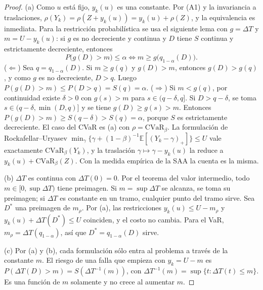 \begin{proof}
(a) Como $u$ está fijo, $y_k(u)$ es una constante. Por (A1) y la invariancia a traslaciones,
$\rho(Y_k)=\rho(Z+y_k(u))=y_k(u)+\rho(Z)$, y la equivalencia es inmediata. Para la restricción
probabilística se usa el siguiente lema con $g=\Delta T$ y $m=U-y_k(u)$: si $g$ es no decreciente
y continua y $D$ tiene $S$ continua y estrictamente decreciente, entonces
\[P\big(g(D)>m\big)\le\alpha\iff m\ge g\big(q_{1-\alpha}(D)\big).\]
($\Leftarrow$) Sea $q=q_{1-\alpha}(D)$. Si $m\ge g(q)$ y $g(D)>m$, entonces $g(D)>g(q)$, y como $g$
es no decreciente, $D>q$. Luego $P(g(D)>m)\le P(D>q)=S(q)=\alpha$. ($\Rightarrow$) Si $m<g(q)$, por
continuidad existe $\delta>0$ con $g(s)>m$ para $s\in(q-\delta,q]$. Si $D>q-\delta$, se toma
$s\in(q-\delta,\min(D,q)]$ y se tiene $g(D)\ge g(s)>m$. Entonces
$P(g(D)>m)\ge S(q-\delta)>S(q)=\alpha$, porque $S$ es estrictamente decreciente.
El caso del CVaR es (a) con $\rho=\mathrm{CVaR}_\beta$. La formulación de Rockafellar--Uryasev
$\min_\gamma\{\gamma+(1-\beta)^{-1}\mathbb E[(Y_k-\gamma)_+]\}\le U$ vale exactamente
$\mathrm{CVaR}_\beta(Y_k)$, y la traslación $\gamma\mapsto\gamma-y_k(u)$ la reduce a
$y_k(u)+\mathrm{CVaR}_\beta(Z)$. Con la medida empírica de la SAA la cuenta es la misma.

(b) $\Delta T$ es continua con $\Delta T(0)=0$. Por el teorema del valor intermedio, todo
$m\in[0,\sup\Delta T)$ tiene preimagen. Si $m=\sup\Delta T$ se alcanza, se toma su preimagen;
si $\Delta T$ es constante en un tramo, cualquier punto del tramo sirve. Sea $D^\ast$ una
preimagen de $m_\rho$. Por (a), las restricciones $y_k(u)\le U-m_\rho$ y
$y_k(u)+\Delta T(D^\ast)\le U$ coinciden, y el costo no cambia. Para el VaR,
$m_\rho=\Delta T(q_{1-\alpha})$, así que $D^\ast=q_{1-\alpha}(D)$ sirve.

(c) Por (a) y (b), cada formulación sólo entra al problema a través de la constante $m$. El
riesgo de una falla que empieza con $y_k=U-m$ es $P(\Delta T(D)>m)=S(\Delta T^{-1}(m))$, con
$\Delta T^{-1}(m)=\sup\{t:\Delta T(t)\le m\}$. Es una función de $m$ solamente y no crece al
aumentar $m$.
\end{proof}

